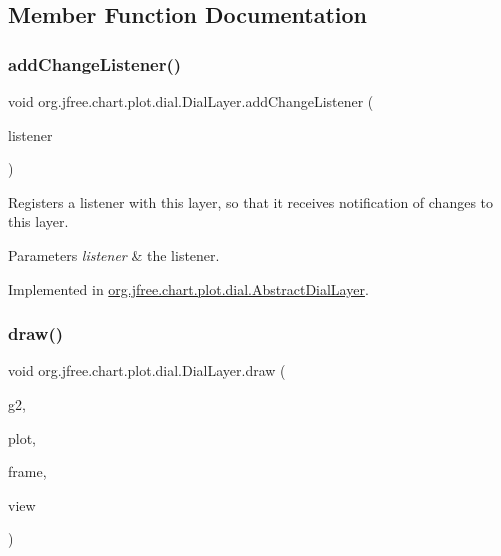 \subsection{Member Function Documentation}
\mbox{\label{interfaceorg_1_1jfree_1_1chart_1_1plot_1_1dial_1_1_dial_layer_a6a2e5bdf252099b17e57f3685db6e2e4}} 
\subsubsection{\texorpdfstring{add\+Change\+Listener()}{addChangeListener()}}
{\footnotesize\ttfamily void org.\+jfree.\+chart.\+plot.\+dial.\+Dial\+Layer.\+add\+Change\+Listener (\begin{DoxyParamCaption}\item[{\mbox{\hyperlink{interfaceorg_1_1jfree_1_1chart_1_1plot_1_1dial_1_1_dial_layer_change_listener}{Dial\+Layer\+Change\+Listener}}}]{listener }\end{DoxyParamCaption})}

Registers a listener with this layer, so that it receives notification of changes to this layer.


\begin{DoxyParams}{Parameters}
{\em listener} & the listener. \\
\hline
\end{DoxyParams}


Implemented in \mbox{\hyperlink{classorg_1_1jfree_1_1chart_1_1plot_1_1dial_1_1_abstract_dial_layer_ac0d049259317ed60eff0d0c38ecd1f34}{org.\+jfree.\+chart.\+plot.\+dial.\+Abstract\+Dial\+Layer}}.

\mbox{\label{interfaceorg_1_1jfree_1_1chart_1_1plot_1_1dial_1_1_dial_layer_aa4564e018317f0fdc7dbe85a46e7a4a4}} 
\subsubsection{\texorpdfstring{draw()}{draw()}}
{\footnotesize\ttfamily void org.\+jfree.\+chart.\+plot.\+dial.\+Dial\+Layer.\+draw (\begin{DoxyParamCaption}\item[{Graphics2D}]{g2,  }\item[{\mbox{\hyperlink{classorg_1_1jfree_1_1chart_1_1plot_1_1dial_1_1_dial_plot}{Dial\+Plot}}}]{plot,  }\item[{Rectangle2D}]{frame,  }\item[{Rectangle2D}]{view }\end{DoxyParamCaption})}

